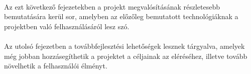 \paragraph{} Az ezt következő fejezetekben a projekt megvalósításának részletesebb bemutatására kerül sor, amelyben az előzőleg bemutatott technológiáknak a projektben való felhasználásáról lesz szó.

\paragraph{} Az utolsó fejezetben a továbbfejlesztési lehetőségek lesznek tárgyalva, amelyek még jobban hozzásegíthetik a projektet a céljainak az eléréséhez, illetve tovább növelhetik a felhasználói élményt.

